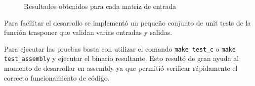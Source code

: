 \documentclass[11pt,a4paper]{article}
\begin{document}
\begin{figure}
\begin{center}
\end{center}
\caption{Resultados obtenidos para cada matriz de entrada}
\label{some example}
\end{figure}

Para facilitar el desarrollo se implementó un pequeño conjunto de unit tests de la función trasponer que validan varias entradas y salidas.

Para ejecutar las pruebas basta con utilizar el comando \texttt{make test\_c} o
\texttt{make test\_assembly} y ejecutar el binario resultante. Esto resultó de gran ayuda al momento de desarrollar en assembly ya que permitió verificar rápidamente el correcto funcionamiento de código.
\end{document}
